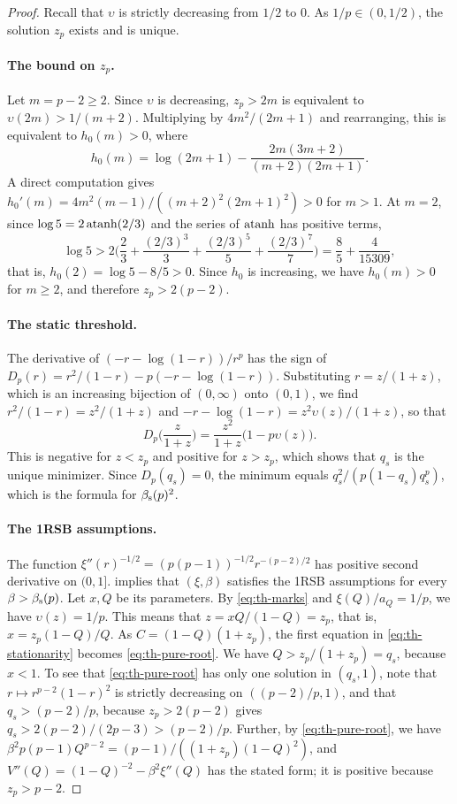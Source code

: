 \begin{proof}
Recall that $\upsilon$ is strictly decreasing from $1/2$ to $0$. As $1/p\in(0,1/2)$, the solution $z_p$ exists and is unique.

\paragraph{The bound on $z_p$.}
Let $m=p-2\ge2$. Since $\upsilon$ is decreasing, $z_p>2m$ is equivalent to $\upsilon(2m)>1/(m+2)$. Multiplying by $4m^2/(2m+1)$ and rearranging, this is equivalent to $h_0(m)>0$, where
\[
h_0(m)=\log(2m+1)-\frac{2m(3m+2)}{(m+2)(2m+1)}.
\]
A direct computation gives $h_0'(m)=4m^2(m-1)/((m+2)^2(2m+1)^2)>0$ for $m>1$. At $m=2$, since $\log5=2\operatorname{atanh}(2/3)$ and the series of $\operatorname{atanh}$ has positive terms,
\[
\log5>2\Big(\frac23+\frac{(2/3)^3}3+\frac{(2/3)^5}5+\frac{(2/3)^7}7\Big)=\frac85+\frac4{15309},
\]
that is, $h_0(2)=\log5-8/5>0$. Since $h_0$ is increasing, we have $h_0(m)>0$ for $m\ge2$, and therefore $z_p>2(p-2)$.

\paragraph{The static threshold.}
The derivative of $(-r-\log(1-r))/r^p$ has the sign of $D_p(r)=r^2/(1-r)-p(-r-\log(1-r))$. Substituting $r=z/(1+z)$, which is an increasing bijection of $(0,\infty)$ onto $(0,1)$, we find $r^2/(1-r)=z^2/(1+z)$ and $-r-\log(1-r)=z^2\upsilon(z)/(1+z)$, so that
\[
D_p\Big(\frac z{1+z}\Big)=\frac{z^2}{1+z}\big(1-p\upsilon(z)\big).
\]
This is negative for $z<z_p$ and positive for $z>z_p$, which shows that $q_s$ is the unique minimizer. Since $D_p(q_s)=0$, the minimum equals $q_s^2/(p(1-q_s)q_s^p)$, which is the formula for $\beta_{\mathrm s}(p)^2$.

\paragraph{The 1RSB assumptions.}
The function $\xi''(r)^{-1/2}=(p(p-1))^{-1/2}r^{-(p-2)/2}$ has positive second derivative on $(0,1]$.  implies that $(\xi,\beta)$ satisfies the 1RSB assumptions for every $\beta>\beta_{\mathrm s}(p)$. Let $x,Q$ be its parameters. By \eqref{eq:th-marks} and $\xi(Q)/a_Q=1/p$, we have $\upsilon(z)=1/p$. This means that $z=xQ/(1-Q)=z_p$, that is, $x=z_p(1-Q)/Q$. As $C=(1-Q)(1+z_p)$, the first equation in \eqref{eq:th-stationarity} becomes \eqref{eq:th-pure-root}. We have $Q>z_p/(1+z_p)=q_s$, because $x<1$. To see that \eqref{eq:th-pure-root} has only one solution in $(q_s,1)$, note that $r\mapsto r^{p-2}(1-r)^2$ is strictly decreasing on $((p-2)/p,1)$, and that $q_s>(p-2)/p$, because $z_p>2(p-2)$ gives $q_s>2(p-2)/(2p-3)>(p-2)/p$. Further, by \eqref{eq:th-pure-root}, we have $\beta^2p(p-1)Q^{p-2}=(p-1)/((1+z_p)(1-Q)^2)$, and $V''(Q)=(1-Q)^{-2}-\beta^2\xi''(Q)$ has the stated form; it is positive because $z_p>p-2$.


\end{proof}
